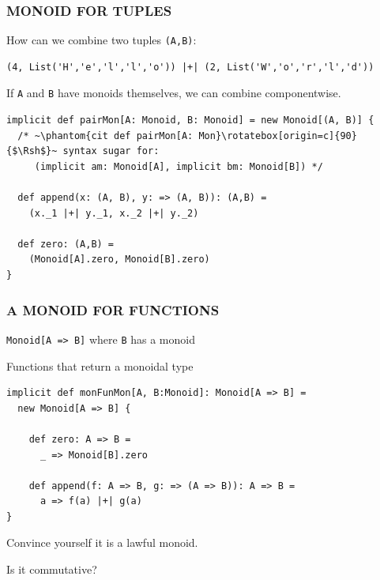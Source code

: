 \documentclass{beamer}
\begin{document}
\begin{frame}[fragile]\frametitle{MONOID FOR TUPLES}
  How can we combine two tuples \texttt{(A,B)}:

  \begin{block}{}
  \begin{lstlisting}
(4, List('H','e','l','l','o')) |+| (2, List('W','o','r','l','d'))
  \end{lstlisting}
  \end{block}

  \pause

  If \texttt{A} and \texttt{B} have monoids themselves, we can \alert{combine componentwise}.

  \begin{block}{}
  \begin{lstlisting}
implicit def pairMon[A: Monoid, B: Monoid] = new Monoid[(A, B)] {
  /* ~\phantom{cit def pairMon[A: Mon}\rotatebox[origin=c]{90}{$\Rsh$}~ syntax sugar for:
     (implicit am: Monoid[A], implicit bm: Monoid[B]) */

  def append(x: (A, B), y: => (A, B)): (A,B) =
    (x._1 |+| y._1, x._2 |+| y._2)

  def zero: (A,B) =
    (Monoid[A].zero, Monoid[B].zero)
}
  \end{lstlisting}
  \end{block}
\end{frame}


\begin{frame}[fragile] \frametitle{A MONOID FOR FUNCTIONS}
  \texttt{Monoid[A => B]} \pause where \alert{\texttt{B} has a monoid}

  \begin{block}{Functions that return a monoidal type}
  \begin{lstlisting}
implicit def monFunMon[A, B:Monoid]: Monoid[A => B] =
  new Monoid[A => B] {

    def zero: A => B =
      _ => Monoid[B].zero

    def append(f: A => B, g: => (A => B)): A => B =
      a => f(a) |+| g(a)
}
  \end{lstlisting}
  \end{block}
  Convince yourself it is a lawful monoid.

  Is it commutative?
\end{frame}
\end{document}
